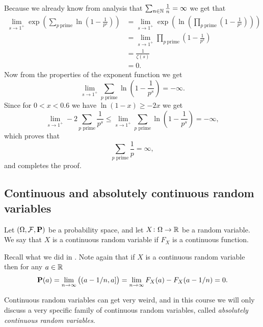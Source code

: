 \documentclass[11pt,a4paper]{article}
\begin{document}
\begin{proofof}{}
  Because we already know from analysis that 
  $\sum_{n \in \mathbb{N}} \frac 1n = \infty$ we get that
  \begin{align*}
    \lim_{s \to 1^+}
    \exp\left(\sum_{p \ \mathrm{prime}}
    \ln \left(1 - \frac{1}{p^{s}}\right)\right) &=
    \lim_{s \to 1^+}
    \exp \left(\ln\left(\prod_{p \ \mathrm{prime}}
    \left(1 - \frac{1}{p^{s}}\right)\right)\right) \\ &= 
    \lim_{s \to 1^+} 
    \prod_{p \ \mathrm{prime}} \left(1 - \frac{1}{p^{s}}\right) \\ &= 
    \frac{1}{\zeta(s)} \\ &=
    0.
  \end{align*}
  Now from the properties of the exponent function we get
  \[
    \lim_{s \to 1^+} 
    \sum_{p \text{ prime}} \ln\left(1 - \frac{1}{p^{s}}\right) =
    - \infty.
  \]
  Since for $0 < x < 0.6$ we have $\ln(1-x) \geq -2x$ we get
  \[
    \lim_{s \to 1^+}
    -2 \sum_{p \text{ prime}} \frac{1}{p^s} \le
    \lim_{s \to 1^+}
    \sum_{p \text{ prime}} \ln\left(1 - \frac{1}{p^{s}}\right) =
    - \infty,
  \]
  which proves that
  \[
    \sum_{p \text{ prime}} \frac{1}{p} = \infty,
  \]
  and completes the proof.
\end{proofof}

\subsection{Continuous and absolutely continuous random variables}

\begin{definition}
  Let $(\Omega, \mathcal F, \mathbf{P})$ be a probability space,
  and let $X \colon \Omega \to \mathbb{R}$ be a random variable.
  We say that $X$ is a continuous random variable if $F_X$ is a
  continuous function.
\end{definition}
\begin{remark}
  Recall what we did in .
  Note again that
  if $X$ is a continuous random variable then for any $a \in \mathbb{R}$
  \[
    \mathbf{P}(a) = 
    \lim_{n \to \infty}\left((a - 1/n, a]\right) =
    \lim_{n \to \infty} F_X(a) - F_X(a - 1/n) =
    0.
  \]
\end{remark}

\begin{remark}
  Continuous random variables can get very weird, and in this course we
  will only discuss a very specific family of continuous random variables,
  called \textit{absolutely continuous random variables}.
\end{remark}
\end{document}
